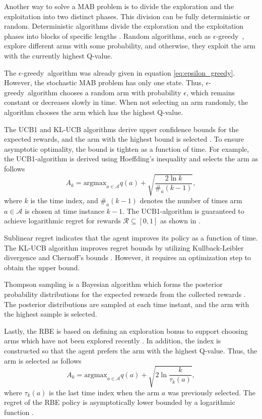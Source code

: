 \documentclass[english, 12pt, a4paper, elec, utf8, a-1b, online]{aaltothesis}
\numberwithin{equation}{section}
\newcommand{\As}{\mathcal{A}}
\newcommand{\Rs}{\mathcal{R}}
\newcommand{\argmax}{\text{argmax}}
\newcommand{\egreedy}{$\epsilon$-greedy~}
\begin{document}
Another way to solve a MAB problem is to divide the exploration and the exploitation into two distinct phases. 
This division can be fully deterministic or random. 
Deterministic algorithms divide the exploration and the exploitation phases into blocks of specific lengths \cite{Lattimore2019}. 
Random algorithms, such as \egreedy, explore different arms with some probability, and otherwise, they exploit the arm with the currently highest Q-value.

The \egreedy algorithm was already given in equation \eqref{eq:epsilon_greedy}.
However, the stochastic MAB problem has only one state.
Thus, \egreedy algorithm chooses a random arm with probability $\epsilon$, which remains constant or decreases slowly in time. 
When not selecting an arm randomly, the algorithm chooses the arm which has the highest Q-value.

The UCB1 and KL-UCB algorithms derive upper confidence bounds for the expected rewards, and the arm with the highest bound is selected \cite{Auer2002, Garivier2011}.
To ensure asymptotic optimality, the bound is tighten as a function of time.
For example, the UCB1-algorithm is derived using Hoeffding's inequality and selects the arm as follows \cite{Auer2002}
\begin{equation}
    A_k = \argmax_{a \in \As} q(a) + \sqrt{\frac{2 \ln{k}}{\#_a(k-1)}},
\end{equation}
where $k$ is the time index, and $\#_a(k-1)$ denotes the number of times arm $a \in \As$ is chosen at time instance $k-1$.
The UCB1-algorithm is guaranteed to achieve logarithmic regret for rewards $\Rs \subseteq [0, 1]$ as shown in \cite{Auer2002}.

Sublinear regret indicates that the agent improves its policy as a function of time.
The KL-UCB algorithm improves regret bounds by utilizing Kullback-Leibler divergence and Chernoff's bounds \cite{Garivier2011}.
However, it requires an optimization step to obtain the upper bound.

Thompson sampling is a Bayesian algorithm which forms the posterior probability distributions for the expected rewards from the collected rewards \cite{Agrawal2012}.
The posterior distributions are sampled at each time instant, and the arm with the highest sample is selected.

Lastly, the RBE is based on defining an exploration bonus to support choosing arms which have not been explored recently \cite{Oksanen2015}.
In addition, the index is constructed so that the agent prefers the arm with the highest Q-value.
Thus, the arm is selected as follows
\begin{equation}
    A_k = \argmax_{a \in \As} q(a) + \sqrt{2\ln{\frac{k}{\tau_k(a)}}},
\end{equation}
where $\tau_k(a)$ is the last time index when the arm $a$ was previously selected.
The regret of the RBE policy is asymptotically lower bounded by a logarithmic function \cite{Oksanen2015}.
\end{document}
